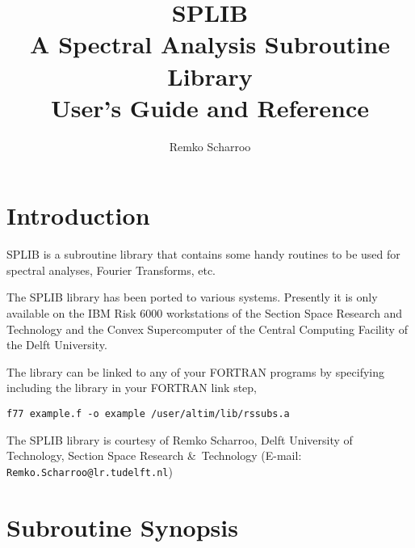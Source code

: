 \documentclass[a4paper]{article}
\title{SPLIB \\ A Spectral Analysis Subroutine Library \\
User's Guide and Reference}
\author{Remko Scharroo}
\def\Input#1{\vbox{}}
\begin{document}
\somfront
\tableofcontents

\section{Introduction}
SPLIB is a subroutine library that contains some handy routines to be
used for spectral analyses, Fourier Transforms, etc.

The SPLIB library has been ported to various systems. Presently it is
only available on the IBM Risk 6000 workstations of the Section Space
Research and Technology and the Convex Supercomputer of the Central
Computing Facility of the Delft University.

The library can be linked to any of your FORTRAN programs by specifying
including the library in your FORTRAN link step, \eg
\begin{verbatim}
f77 example.f -o example /user/altim/lib/rssubs.a
\end{verbatim}

The SPLIB library is courtesy of Remko Scharroo, Delft University of
Technology, Section Space Research \&\ Technology
(E-mail: {\tt Remko.Scharroo@lr.tudelft.nl})

\section{Subroutine Synopsis}
\Input{spcdem}
\Input{spcomp}
\Input{spdftc}
\Input{spdftr}

\Input{spfamp}
\Input{spfftc}
\Input{spfftr}
\Input{spfper}
\Input{sprand}
\Input{statis}
\end{document}
